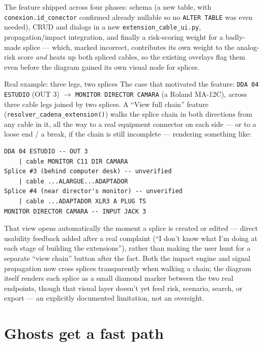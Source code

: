 \documentclass[10.4pt,twocolumn]{article}
\begin{document}
The feature shipped across four phases: schema (a new table, with \texttt{conexion.id\_conector} confirmed already nullable so no \texttt{ALTER TABLE} was even needed), CRUD and dialogs in a new \texttt{extension\_cable\_ui.py}, propagation/impact integration, and finally a risk-scoring weight for a badly-made splice --- which, marked incorrect, contributes its own weight to the analog-risk score \emph{and} heats up both spliced cables, so the existing overlays flag them even before the diagram gained its own visual node for splices.

\begin{specbox}{Real example: three legs, two splices}
The case that motivated the feature: \texttt{DDA 04 ESTUDIO} (OUT 3) $\to$ \texttt{MONITOR DIRECTOR CAMARA} (a Roland MA-12C), across three cable legs joined by two splices. A ``View full chain'' feature (\texttt{resolver\_cadena\_extension()}) walks the splice chain in both directions from any cable in it, all the way to a real equipment connector on each side --- or to a loose end / a break, if the chain is still incomplete --- rendering something like:
\end{specbox}

\begin{lstlisting}[language={},numbers=none]
DDA 04 ESTUDIO -- OUT 3
    | cable MONITOR C11 DIR CAMARA
Splice #3 (behind computer desk) -- unverified
    | cable ...ALARGUE...ADAPTADOR
Splice #4 (near director's monitor) -- unverified
    | cable ...ADAPTADOR XLR3 A PLUG TS
MONITOR DIRECTOR CAMARA -- INPUT JACK 3
\end{lstlisting}

That view opens automatically the moment a splice is created or edited --- direct usability feedback added after a real complaint (``I don't know what I'm doing at each stage of building the extensions''), rather than making the user hunt for a separate ``view chain'' button after the fact. Both the impact engine and signal propagation now cross splices transparently when walking a chain; the diagram itself renders each splice as a small diamond marker between the two real endpoints, though that visual layer doesn't yet feed risk, scenario, search, or export --- an explicitly documented limitation, not an oversight.

\section{Ghosts get a fast path}
\end{document}
